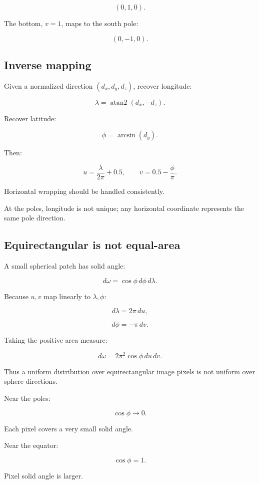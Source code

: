 \[ (0,1,0). \]

The bottom, \(v=1\), maps to the south pole:

\[ (0,-1,0). \]

\subsection{Inverse mapping}\label{02-foundations-ii-ch035-inverse-mapping}

Given a normalized direction \((d_x,d_y,d_z)\), recover longitude:

\[ \boxed{ \lambda=\operatorname{atan2}(d_x,-d_z). } \]

Recover latitude:

\[ \boxed{ \phi=\arcsin(d_y). } \]

Then:

\[ \boxed{ u=\frac{\lambda}{2\pi}+0.5, \qquad v=0.5-\frac{\phi}{\pi}. } \]

Horizontal wrapping should be handled consistently.

At the poles, longitude is not unique; any horizontal coordinate represents the same pole direction.

\subsection{Equirectangular is not equal-area}\label{02-foundations-ii-ch035-equirectangular-is-not-equal-area}

A small spherical patch has solid angle:

\[ \boxed{ d\omega=\cos\phi\,d\phi\,d\lambda. } \]

Because \(u,v\) map linearly to \(\lambda,\phi\):

\[ d\lambda=2\pi\,du, \]

\[ d\phi=-\pi\,dv. \]

Taking the positive area measure:

\[ \boxed{ d\omega=2\pi^2\cos\phi\,du\,dv. } \]

Thus a uniform distribution over equirectangular image pixels is not uniform over sphere directions.

Near the poles:

\[ \cos\phi\to0. \]

Each pixel covers a very small solid angle.

Near the equator:

\[ \cos\phi=1. \]

Pixel solid angle is larger.

